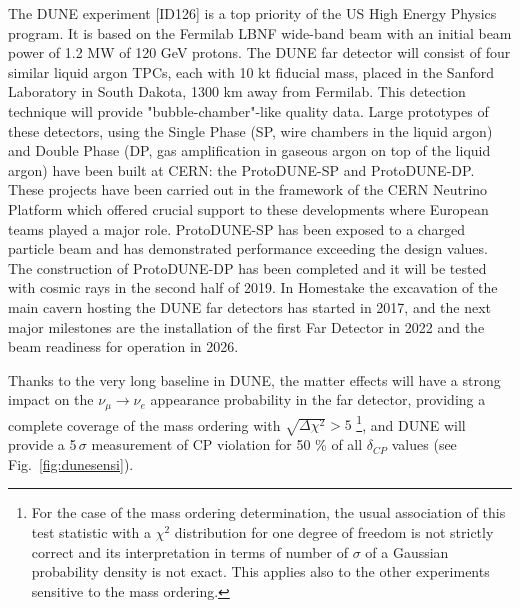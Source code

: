 The DUNE experiment [ID126] %
is a top priority of the US High Energy Physics program. It is based on the Fermilab LBNF wide-band beam with an initial beam power of 1.2 MW of 120 GeV protons. The DUNE far detector will consist of four similar liquid argon TPCs, each with 10 kt fiducial mass, placed in the Sanford Laboratory in South Dakota, 1300 km away from Fermilab.
This detection technique will provide "bubble-chamber"-like quality data.
Large prototypes of these detectors, using the Single Phase (SP, wire chambers in the liquid argon) and Double Phase (DP, gas amplification in gaseous argon on top of the liquid argon) have been built at CERN: the ProtoDUNE-SP and ProtoDUNE-DP.
These projects have been carried out in the framework of the CERN Neutrino Platform which offered crucial support to these developments where European teams played a major role.
ProtoDUNE-SP has been exposed to a charged particle beam and has demonstrated performance exceeding the design values. %
The construction of ProtoDUNE-DP has been completed and it will be tested with cosmic rays in the second half of 2019.
In Homestake the excavation of the main cavern hosting the DUNE far detectors has started in 2017, and the next major milestones are the installation of the first Far Detector in 2022 and the beam readiness for operation in 2026. %

Thanks to the very long baseline in DUNE, the matter effects will have a strong impact on the $\nu_{\mu} \rightarrow \nu_e$ appearance probability in the far detector, providing a complete coverage of the mass ordering with $\sqrt{\Delta \chi^2} > 5 $ \footnote{For the case of the mass ordering determination, the usual association of this test statistic with a $\chi^2$ distribution for one degree
of freedom is not strictly correct and its interpretation 
in terms of number of $\sigma$ of a Gaussian probability density
is not exact. This applies also to the other experiments sensitive to the mass ordering.}, and DUNE will provide a 5\,$\sigma$ measurement of CP violation for 50 \% of all $\delta_{CP}$ values (see Fig.~\ref{fig:dunesensi}). 


